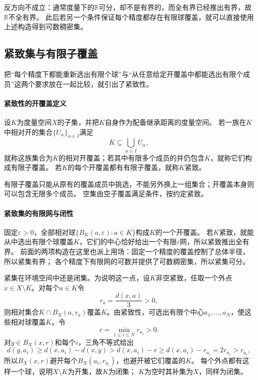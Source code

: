 反方向不成立：通常度量下的$\mathbb R$可分，却不是有界的，而全有界已经推出有界，故$\mathbb R$不全有界。
此后若另一个条件保证每个精度都存在有限球覆盖，就可以直接使用上述构造得到可数稠密集。

\subsection{紧致集与有限子覆盖}
\label{sec:metric-compact-control}

把“每个精度下都能重新选出有限个球”与“从任意给定开覆盖中都能选出有限个成员”这两个要求放在一起比较，就引出了紧致性。

\paragraph{紧致性的开覆盖定义}

\begin{definition}
\label{def:metric-compactness}
设$K$为度量空间$X$的子集，并把$K$自身作为配备继承距离的度量空间。
若一族在$K$中相对开的集合$\{U_\alpha\}_{\alpha\in I}$满足
\[
  K\subseteq\bigcup_{\alpha\in I}U_\alpha,
\]
就称这族集合为$K$的相对开覆盖；若其中有限多个成员的并仍包含$K$，就称它们构成有限子覆盖。
若$K$的每个开覆盖都有有限子覆盖，就称$K$紧致。
\end{definition}

有限子覆盖只能从原有的覆盖成员中挑选，不能另外换上一组集合；开覆盖本身则可以包含无限多个成员。
空集由空子覆盖满足条件，按约定紧致。

\paragraph{紧致集的有限网与闭性}

固定$\varepsilon>0$，全部相对球$\{B_K(a,\varepsilon):a\in K\}$构成$K$的一个开覆盖。
若$K$紧致，就能从中选出有限个球覆盖$K$，它们的中心恰好给出一个有限$\varepsilon$网，所以紧致推出全有界。
前面的两项构造在这里也派上用场：固定一个精度的覆盖控制了总体半径，所以紧集有界；
各个精度下有限网的可数并提供了可数稠密集，所以紧集可分。

紧集在环境空间中还是闭集。为说明这一点，设$K$非空紧致，任取一个外点$x\in X\setminus K$。对每个$a\in K$令
\[
  r_a=\frac{d(x,a)}{3}>0,
\]
则相对集合$K\cap B_X(a,r_a)$覆盖$K$。由紧致性，可选出有限个中心$a_1,\ldots,a_N$，使这些相对球覆盖$K$。令
\[
  r=\min_{1\leq i\leq N}r_{a_i}>0.
\]
对$y\in B_X(x,r)$和每个$i$，三角不等式给出
\[
  d(y,a_i)\geq d(x,a_i)-d(x,y)>d(x,a_i)-r\geq d(x,a_i)-r_{a_i}=2r_{a_i}>r_{a_i},
\]
所以$B_X(x,r)$避开每个$B_X(a_i,r_{a_i})$，也避开被它们覆盖的$K$。
每个外点都有这样一个球，说明$X\setminus K$为开集，故$K$为闭集；
$K$为空时其补集为$X$，同样为闭集。

